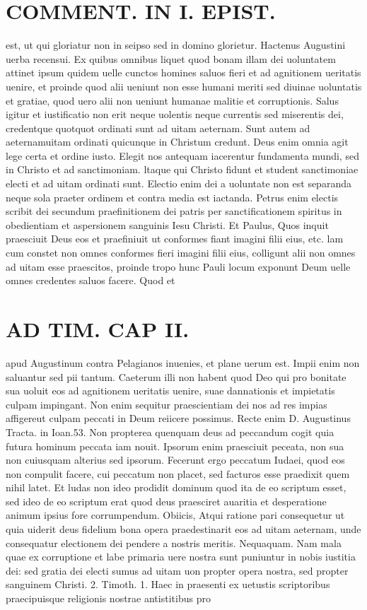 \documentclass{article}
\begin{document}
\begin{pages}
\section*{COMMENT. IN I. EPIST. }\pstart est, ut qui gloriatur non in seipso sed in domino glorietur. Hactenus Augustini uerba recensui. Ex quibus omnibus liquet quod bonam illam dei uoluntatem attinet ipsum quidem uelle cunctos homines saluos fieri et ad agnitionem ueritatis uenire, et proinde quod alii ueniunt non esse humani meriti sed diuinae uoluntatis et gratiae, quod uero alii non ueniunt humanae malitie et corruptionis. Salus igitur et iustificatio non erit neque uolentis neque currentis sed miserentis dei, credentque quotquot ordinati sunt ad uitam aeternam. Sunt autem ad aeternamuitam ordinati quicunque in Christum credunt. Deus enim omnia agit lege certa et ordine iusto. Elegit nos antequam iacerentur fundamenta mundi, sed in Christo et ad sanctimoniam. ltaque qui Christo fidunt et student sanctimoniae electi et ad uitam ordinati sunt. Electio enim dei a uoluntate non est separanda neque sola praeter ordinem et contra media est iactanda. Petrus enim electis scribit dei secundum praefinitionem dei patris per sanctificationem spiritus in obedientiam et aspersionem sanguinis Iesu Christi. Et Paulus, Quos inquit praesciuit Deus eos et praefiniuit ut conformes fiant imagini filii eius, etc. lam cum constet non omnes conformes fieri imagini filii eius, colligunt alii non omnes ad uitam esse praescitos, proinde tropo hunc Pauli locum exponunt Deum uelle omnes credentes saluos facere. Quod et  \pend
\section*{AD TIM. CAP II. }
\marginpar{[ p.115 ]}\pstart apud Augustinum contra Pelagianos inuenies, et plane uerum est. Impii enim non saluantur sed pii tantum. Caeterum illi non habent quod Deo qui pro bonitate sua uoluit eos ad agnitionem ueritatis uenire, suae dannationis et impietatis culpam impingant. Non enim sequitur praescientiam dei nos ad res impias affigereut culpam peccati in Deum reiicere possimus. Recte enim D. Augustinus Tracta. in Ioan.53. Non propterea quenquam deus ad peccandum cogit quia futura hominum peccata iam nouit. Ipsorum enim praesciuit peceata, non sua non cuiusquam alterius sed ipsorum. Fecerunt ergo peccatum Iudaei, quod eos non compulit facere, cui peccatum non placet, sed facturos esse praedixit quem nihil latet. Et ludas non ideo prodidit dominum quod ita de eo scriptum esset, sed ideo de eo scriptum erat quod deus praesciret auaritia et desperatione animum ipsius fore corrumpendum. Obiicis, Atqui ratione pari consequetur ut quia uiderit deus fidelium bona opera praedestinarit eos ad uitam aeternam, unde consequatur electionem dei pendere a nostris meritis. Nequaquam. Nam mala quae ex corruptione et labe primaria uere nostra sunt puniuntur in nobis iustitia dei: sed gratia dei electi sumus ad uitam uon propter opera nostra, sed propter sanguinem Christi. 2. Timoth. 1. Haec in praesenti ex uetustis scriptoribus praecipuisque religionis nostrae antistitibus pro  \pend

\end{pages}
\end{document}
